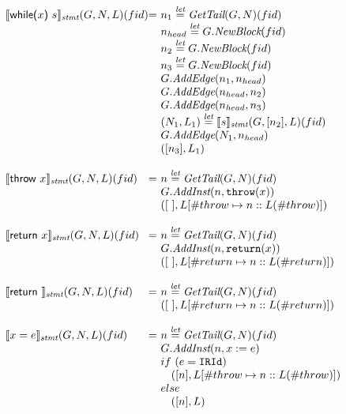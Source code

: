 \[
\begin{array}{l@{}l@{~}l}
\transfun{\irwhile{x}{s}}_{\emph{stmt}}(G,N,L)(fid) & = &
	n_1 \letval \GetTail(G,N)(fid)\\
	& & n_{head} \letval G.\emph{NewBlock}(fid)\\
	& & n_2 \letval G.\emph{NewBlock}(fid)\\
	& & n_3 \letval G.\emph{NewBlock}(fid)\\
	& & G.\emph{AddEdge}(n_1,n_{head})\\
	& & G.\emph{AddEdge}(n_{head},n_2)\\
	& & G.\emph{AddEdge}(n_{head},n_3)\\
	& & (N_1,L_1) \letval \transfun{s}_{\emph{stmt}}(G,[n_2],L)(fid)\\
	& & G.\emph{AddEdge}(N_1,n_{head})\\
	& & ([n_3],L_1) \\
	& & \\

\transfun{\irthrow{x}}_{\emph{stmt}}(G,N,L)(fid) & = &
	n \letval \GetTail(G,N)(fid)\\
	& & G.\emph{AddInst}(n,\TT{throw}(x))\\
	& & ([\ ],L[\#throw \mapsto n::L(\#throw)])\\
	& & \\

\transfun{\irreturn{x}}_{\emph{stmt}}(G,N,L)(fid) & = &
	n \letval \GetTail(G,N)(fid)\\
	& & G.\emph{AddInst}(n,\TT{return}(x))\\
	& & ([\ ],L[\#return \mapsto n::L(\#return)])\\
	& & \\
	
\transfun{\irreturn{}}_{\emph{stmt}}(G,N,L)(fid) & = &
	n \letval \GetTail(G,N)(fid)\\
	& & ([\ ],L[\#return \mapsto n::L(\#return)])\\
	& & \\
	
\transfun{\irexpr{x}{e}}_{\emph{stmt}}(G,N,L)(fid) & = &
	n \letval \GetTail(G,N)(fid)\\
	& & G.\emph{AddInst}(n,x := e)\\
	& & if\ (e = \TT{IRId}) \\
	& & \phantom{if} ([n],L[\#throw \mapsto n::L(\#throw)])\\
	& & else \\
	& & \phantom{if} ([n],L)\\
	& & \\
	

\end{array}\]
